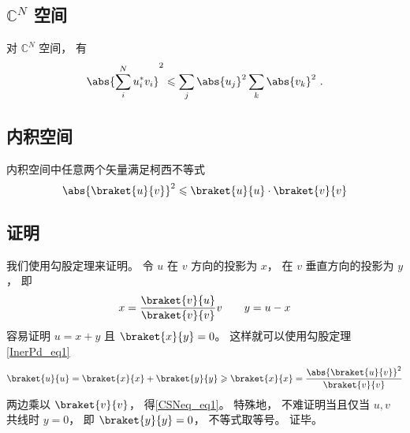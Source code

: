 
\begin{issues}
\issueDraft
\end{issues}

\subsection{$\mathbb C^N$ 空间}
对 $\mathbb C^N$ 空间， 有
\begin{equation}
\abs{\sum_i^N u_i^* v_i}^2 \leqslant \sum_j \abs{u_j}^2 \sum_k \abs{v_k}^2~.
\end{equation}

\subsection{内积空间}
内积空间中任意两个矢量满足柯西不等式
\begin{equation}\label{CSNeq_eq1}
\abs{\braket{u}{v}}^2 \leqslant \braket{u}{u} \cdot \braket{v}{v}
\end{equation}

\subsection{证明}
我们使用勾股定理来证明。 令 $u$ 在 $v$ 方向的投影为 $x$， 在 $v$ 垂直方向的投影为 $y$， 即
\begin{equation}
x = \frac{\braket{v}{u}}{\braket{v}{v}} v \qquad y = u - x
\end{equation}
容易证明 $u = x + y$ 且 $\braket{x}{y} = 0$。 这样就可以使用勾股定理\autoref{InerPd_eq1}~
\begin{equation}
\braket{u}{u} = \braket{x}{x} + \braket{y}{y} \geqslant \braket{x}{x} = \frac{\abs{\braket{u}{v}}^2}{\braket{v}{v}}
\end{equation}
两边乘以 $\braket{v}{v}$， 得\autoref{CSNeq_eq1}。 特殊地， 不难证明当且仅当 $u, v$ 共线时 $y = 0$， 即 $\braket{y}{y} = 0$， 不等式取等号。 证毕。
